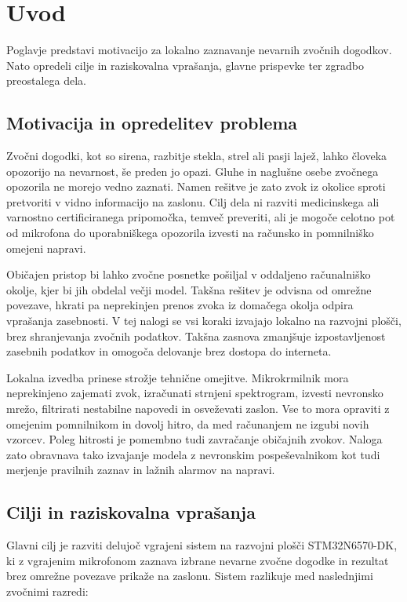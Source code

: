\chapter{Uvod}
\label{ch:uvod}

Poglavje predstavi motivacijo za lokalno zaznavanje nevarnih
zvočnih dogodkov. Nato opredeli cilje in raziskovalna vprašanja, glavne
prispevke ter zgradbo preostalega dela.

\section{Motivacija in opredelitev problema}

Zvočni dogodki, kot so sirena, razbitje stekla, strel ali pasji
lajež, lahko človeka opozorijo na nevarnost, še preden jo opazi. Gluhe in
naglušne osebe zvočnega opozorila ne morejo vedno zaznati. Namen rešitve je zato
zvok iz okolice sproti pretvoriti v vidno informacijo na zaslonu. Cilj dela ni
razviti medicinskega ali varnostno certificiranega pripomočka, temveč preveriti,
ali je mogoče celotno pot od mikrofona do uporabniškega opozorila izvesti na
računsko in pomnilniško omejeni napravi.

Običajen pristop bi lahko zvočne posnetke pošiljal v oddaljeno računalniško
okolje, kjer bi jih obdelal večji model. Takšna rešitev je odvisna od omrežne
povezave, hkrati pa neprekinjen prenos zvoka iz domačega okolja odpira vprašanja
zasebnosti. V tej nalogi se vsi koraki izvajajo lokalno na razvojni plošči, brez
shranjevanja zvočnih podatkov. Takšna zasnova zmanjšuje izpostavljenost zasebnih
podatkov in omogoča delovanje brez dostopa do interneta.

Lokalna izvedba prinese strožje tehnične omejitve. Mikrokrmilnik mora
neprekinjeno zajemati zvok, izračunati strnjeni spektrogram, izvesti
nevronsko mrežo, filtrirati nestabilne napovedi in osveževati zaslon. Vse to
mora opraviti z omejenim pomnilnikom in dovolj hitro, da med računanjem ne
izgubi novih vzorcev. Poleg hitrosti je pomembno tudi zavračanje običajnih
zvokov. Naloga zato obravnava tako izvajanje modela z nevronskim
pospeševalnikom kot tudi merjenje pravilnih zaznav in lažnih alarmov na napravi.

\section{Cilji in raziskovalna vprašanja}

Glavni cilj je razviti delujoč vgrajeni sistem na razvojni plošči
STM32N6570-DK, ki z vgrajenim mikrofonom zaznava izbrane nevarne zvočne
dogodke in rezultat brez omrežne povezave prikaže na zaslonu. Sistem razlikuje
med naslednjimi zvočnimi razredi:

